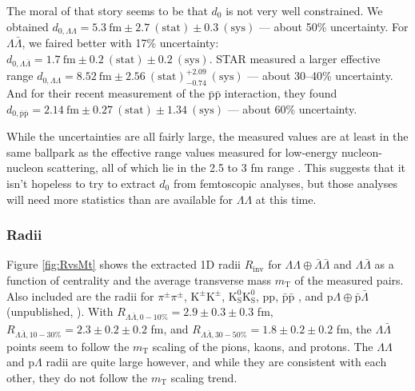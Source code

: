 The moral of that story seems to be that $d_0$ is not very well constrained. 
We obtained $d_{0,\Lambda\Lambda} =  5.3\ \mathrm{fm} \pm 2.7\ \mathrm{(stat)} \pm 0.3\ \mathrm{(sys)}$ --- about 50\% uncertainty.
For $\Lambda\bar{\Lambda}$, we faired better with 17\% uncertainty: $d_{0,\Lambda\bar{\Lambda}} =  1.7\ \mathrm{fm} \pm 0.2\ \mathrm{(stat)} \pm 0.2\ \mathrm{(sys)}$.
STAR measured a larger effective range $d_{0,\Lambda\Lambda} =  8.52\ \mathrm{fm} \pm 2.56\ \mathrm{(stat)}^{+2.09}_{-0.74}\ \mathrm{(sys)}$ --- about 30--40\% uncertainty.
And for their recent measurement of the $\mathrm{\bar{p}\bar{p}}$ interaction, they found $d_{0,\bar{\mathrm{p}}\bar{\mathrm{p}}} = 2.14\ \mathrm{fm} \pm 0.27\ \mathrm{(stat)} \pm 1.34\ \mathrm{(sys)}$ --- about 60\% uncertainty. 

While the uncertainties are all fairly large, the measured values are at least in the same ballpark as the effective range values measured for low-energy nucleon-nucleon scattering, all of which lie in the 2.5 to 3 fm range \cite{Noyes:1973zd}.
This suggests that it isn't hopeless to try to extract $d_0$ from femtoscopic analyses, but those analyses will need more statistics than are available for $\Lambda\Lambda$ at this time.

\subsubsection{Radii}

Figure \ref{fig:RvsMt} shows the extracted 1D radii $R_{\mathrm{inv}}$ for $\Lambda\Lambda\oplus\bar{\Lambda}\bar{\Lambda}$ and $\Lambda\bar{\Lambda}$ as a function of centrality and the average transverse mass $m_{\mathrm{T}}$ of the measured pairs.
Also included are the radii for $\pi^\pm\pi^\pm$, $\mathrm{K^\pm}\mathrm{K^\pm}$, $\mathrm{K^0_S}\mathrm{K^0_S}$, pp, $\bar{\mathrm{p}}\bar{\mathrm{p}}$ \cite{Adam:2015vja}, and p$\Lambda\oplus\bar{\mathrm{p}}\bar{\Lambda}$ (unpublished, \cite{Beck:2015msi}).
With $R_{\Lambda\bar{\Lambda},0-10\%} = 2.9\pm 0.3 \pm 0.3$ fm, $R_{\Lambda\bar{\Lambda},10-30\%} = 2.3\pm 0.2 \pm 0.2$ fm, and $R_{\Lambda\bar{\Lambda},30-50\%} = 1.8\pm 0.2 \pm 0.2$ fm, the $\Lambda\bar{\Lambda}$ points seem to follow the $m_\mathrm{T}$ scaling of the pions, kaons, and protons.
The $\Lambda\Lambda$ and p$\Lambda$ radii are quite large however, and while they are consistent with each other, they do not follow the $m_\mathrm{T}$ scaling trend.





